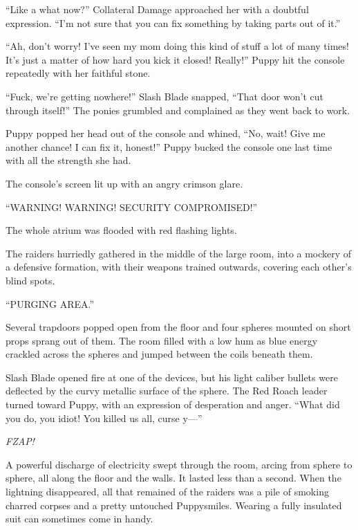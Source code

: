 ``Like a what now?'' Collateral Damage approached her with a doubtful expression. ``I'm not sure that you can fix something by taking parts out of it.''

``Ah, don't worry! I've seen my mom doing this kind of stuff a lot of many times! It's just a matter of how hard you kick it closed! Really!'' Puppy hit the console repeatedly with her faithful stone.

``Fuck, we're getting nowhere!'' Slash Blade snapped, ``That door won't cut through itself!'' The ponies grumbled and complained as they went back to work.

Puppy popped her head out of the console and whined, ``No, wait! Give me another chance! I can fix it, honest!'' Puppy bucked the console one last time with all the strength she had.

The console's screen lit up with an angry crimson glare.

{\mt ``WARNING! WARNING! SECURITY COMPROMISED!''}

The whole atrium was flooded with red flashing lights.

The raiders hurriedly gathered in the middle of the large room, into a mockery of a defensive formation, with their weapons trained outwards, covering each other's blind spots.

{\mt ``PURGING AREA.''}

Several trapdoors popped open from the floor and four spheres mounted on short props sprang out of them. The room filled with a low hum as blue energy crackled across the spheres and jumped between the coils beneath them.

Slash Blade opened fire at one of the devices, but his light caliber bullets were deflected by the curvy metallic surface of the sphere. The Red Roach leader turned toward Puppy, with an expression of desperation and anger. ``What did you do, you idiot! You killed us all, curse y---''

\emph{FZAP!}

A powerful discharge of electricity swept through the room, arcing from sphere to sphere, all along the floor and the walls. It lasted less than a second. When the lightning disappeared, all that remained of the raiders was a pile of smoking charred corpses and a pretty untouched Puppysmiles. Wearing a fully insulated suit can sometimes come in handy.



\horizonline


